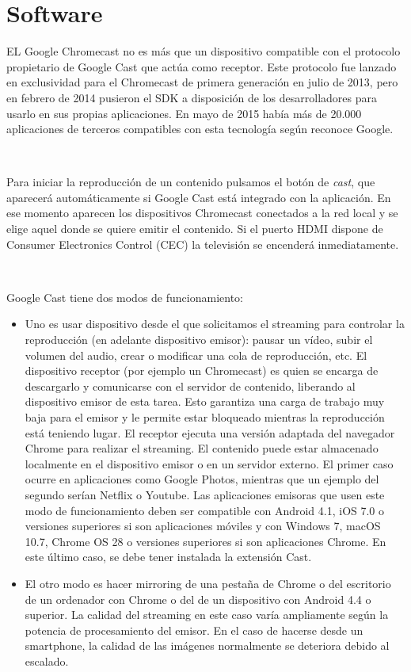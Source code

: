 \section{Software}

EL Google Chromecast no es más que un dispositivo compatible con el protocolo propietario de Google Cast que actúa como receptor. Este protocolo fue lanzado en exclusividad para el Chromecast de primera generación en julio de 2013, pero en febrero de 2014 pusieron el SDK a disposición de los desarrolladores para usarlo en sus propias aplicaciones. En mayo de 2015 había más de 20.000 aplicaciones de terceros compatibles con esta tecnología según reconoce Google.

\

Para iniciar la reproducción de un contenido pulsamos el botón de \textit{cast}, que aparecerá automáticamente si Google Cast está integrado con la aplicación. En ese momento aparecen los dispositivos Chromecast conectados a la red local y se elige aquel donde se quiere emitir el contenido. Si el puerto HDMI dispone de Consumer Electronics Control (CEC) la televisión se encenderá inmediatamente.

\

Google Cast tiene dos modos de funcionamiento:

\begin{itemize}
	\item Uno es usar dispositivo desde el que solicitamos el streaming para controlar la reproducción (en adelante dispositivo emisor): pausar un vídeo, subir el volumen del audio, crear o modificar una cola de reproducción, etc.
	El dispositivo receptor (por ejemplo un Chromecast) es quien se encarga de descargarlo y comunicarse con el servidor de contenido, liberando al dispositivo emisor de esta tarea.
	Esto garantiza una carga de trabajo muy baja para el emisor y le permite estar bloqueado mientras la reproducción está teniendo lugar.
	El receptor ejecuta una versión adaptada del navegador Chrome para realizar el streaming.
	El contenido puede estar almacenado localmente en el dispositivo emisor o en un servidor externo.
	El primer caso ocurre en aplicaciones como Google Photos, mientras que un ejemplo del segundo serían Netflix o Youtube.
	Las aplicaciones emisoras que usen este modo de funcionamiento deben ser compatible con Android 4.1, iOS 7.0 o versiones superiores si son aplicaciones móviles y con Windows 7, macOS 10.7, Chrome OS 28 o versiones superiores si son aplicaciones Chrome.
	En este último caso, se debe tener instalada la extensión Cast.

	\item El otro modo es hacer mirroring de una pestaña de Chrome o del escritorio de un ordenador con Chrome o del de un dispositivo con Android 4.4 o superior.
	La calidad del streaming en este caso varía ampliamente según la potencia de procesamiento del emisor.
	En el caso de hacerse desde un smartphone, la calidad de las imágenes normalmente se deteriora debido al escalado.
\end{itemize}

